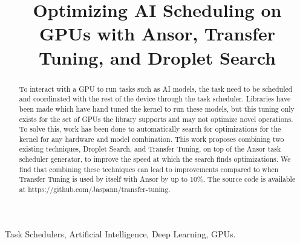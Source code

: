 \documentclass[conference]{IEEEtran}
\begin{document}
\title{Optimizing AI Scheduling on GPUs with Ansor, Transfer Tuning, and Droplet Search}  

\author{
\and
{}
\and
{}
}

\maketitle

\begin{abstract}
To interact with a GPU to run tasks such as AI models, the task need to be scheduled and 
coordinated with the rest of the device through the task scheduler.
Libraries have been made which have hand tuned the kernel to run these models, 
but this tuning only exists for the set of GPUs the library supports and may not optimize novel operations.
To solve this, work has been done to automatically search for optimizations for the kernel for any hardware and model combination. 
This work proposes combining two existing techniques, Droplet Search, and Transfer Tuning, on top of the Ansor task scheduler generator, 
to improve the speed at which the search finds optimizations. 
We find that combining these techniques can lead to improvements compared to when Transfer Tuning is used by itself with Ansor by up to 10\%.
The source code is available at https://github.com/Jaspann/transfer-tuning.
\end{abstract}

\begin{IEEEkeywords}
Task Schedulers, Artificial Intelligence, Deep Learning, GPUs.
\end{IEEEkeywords}
\end{document}
